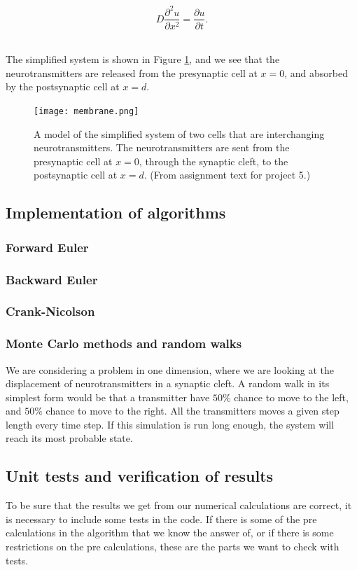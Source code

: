 \documentclass[12pt]{article}
\begin{document}
\begin{flushleft}
\vspace{5mm}
$$D\frac{\partial^2 u}{\partial x^2} = \frac{\partial u}{\partial t}.$$\\
\vspace{5mm}

The simplified system is shown in Figure \ref{fig:cleft_model}, and we see that the neurotransmitters are released from the presynaptic cell at $x=0$, and absorbed by the postsynaptic cell at $x = d$.

\begin{figure}[!h]
\begin{center}
\texttt{[image: membrane.png]}
\caption{\label{fig:cleft_model}A model of the simplified system of two cells that are interchanging neurotransmitters. The neurotransmitters are sent from the presynaptic cell at $x=0$, through the synaptic cleft, to the postsynaptic cell at $x=d$. (From assignment text for project 5.)}
\end{center}
\end{figure}

\subsection{Implementation of algorithms}
\subsubsection{Forward Euler}
\subsubsection{Backward Euler}
\subsubsection{Crank-Nicolson}
\subsubsection{Monte Carlo methods and random walks}
We are considering a problem in one dimension, where we are looking at the displacement of neurotransmitters in a synaptic cleft. A random walk in its simplest form would be that a transmitter have $50\%$ chance to move to the left, and $50\%$ chance to move to the right. All the transmitters moves a given step length every time step. If this simulation is run long enough, the system will reach its most probable state. 


\subsection{Unit tests and verification of results}
To be sure that the results we get from our numerical calculations are correct, it is necessary to include some tests in the code. If there is some of the pre calculations in the algorithm that we know the answer of, or if there is some restrictions on the pre calculations, these are the parts we want to check with tests.

\end{flushleft}
\end{document}
